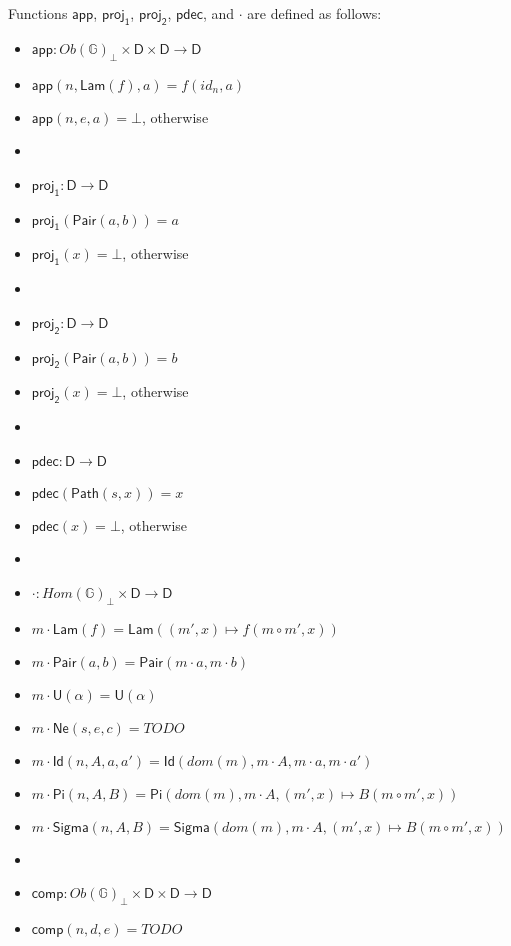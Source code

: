 \documentclass{amsart}
\theoremstyle{definition}
\theoremstyle{remark}
\newcommand{\D}{\mathsf{D}}
\newcommand{\bbG}{\mathbb{G}}
\numberwithin{table}{section}
\begin{document}
Functions $\mathsf{app}$, $\mathsf{proj_1}$, $\mathsf{proj_2}$, $\mathsf{pdec}$, and $\cdot$ are defined as follows:
\begin{itemize}
\item[] $\mathsf{app} : Ob(\bbG)_\bot \times \D \times \D \to \D$
\item[] $\mathsf{app}(n,\mathsf{Lam}(f),a) = f(id_n,a)$
\item[] $\mathsf{app}(n,e,a) = \bot$, otherwise
\item[]
\item[] $\mathsf{proj_1} : \D \to \D$
\item[] $\mathsf{proj_1}(\mathsf{Pair}(a,b)) = a$
\item[] $\mathsf{proj_1}(x) = \bot$, otherwise
\item[]
\item[] $\mathsf{proj_2} : \D \to \D$
\item[] $\mathsf{proj_2}(\mathsf{Pair}(a,b)) = b$
\item[] $\mathsf{proj_2}(x) = \bot$, otherwise
\item[]
\item[] $\mathsf{pdec} : \D \to \D$
\item[] $\mathsf{pdec}(\mathsf{Path}(s,x)) = x$
\item[] $\mathsf{pdec}(x) = \bot$, otherwise
\item[]
\item[] $\cdot : Hom(\bbG)_\bot \times \D \to \D$
\item[] $m \cdot \mathsf{Lam}(f) = \mathsf{Lam}((m',x) \mapsto f(m \circ m', x))$
\item[] $m \cdot \mathsf{Pair}(a, b) = \mathsf{Pair}(m \cdot a, m \cdot b)$
\item[] $m \cdot \mathsf{U}(\alpha) = \mathsf{U}(\alpha)$
\item[] $m \cdot \mathsf{Ne}(s,e,c) = TODO$
\item[] $m \cdot \mathsf{Id}(n, A, a, a') = \mathsf{Id}(dom(m), m \cdot A, m \cdot a, m \cdot a')$
\item[] $m \cdot \mathsf{Pi}(n, A, B) = \mathsf{Pi}(dom(m), m \cdot A, (m', x) \mapsto B(m \circ m', x))$
\item[] $m \cdot \mathsf{Sigma}(n, A, B) = \mathsf{Sigma}(dom(m), m \cdot A, (m', x) \mapsto B(m \circ m', x))$
\item[]
\item[] $\mathsf{comp} : Ob(\bbG)_\bot \times \D \times \D \to \D$
\item[] $\mathsf{comp}(n, d, e) = TODO$
\end{itemize}
\end{document}
